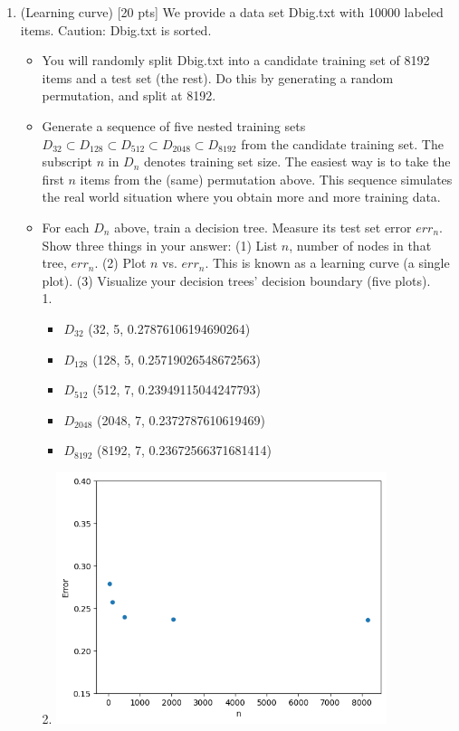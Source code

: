 \documentclass[a4paper]{article}
\theoremstyle{definition}
\begin{document}
\begin{enumerate}
\item (Learning curve)  [20 pts] We provide a data set Dbig.txt with 10000 labeled items.  Caution: Dbig.txt is sorted.
  \begin{itemize}
  
  \item You will randomly split Dbig.txt into a candidate training set of 8192 items and a test set (the rest).  Do this by generating a random permutation, and split at 8192.
  
  \item Generate a sequence of five nested training sets $D_{32} \subset D_{128} \subset D_{512} \subset D_{2048} \subset D_{8192}$ from the candidate training set.  The subscript $n$ in $D_n$ denotes training set size.  The easiest way is to take the first $n$ items from the (same) permutation above.  This sequence simulates the real world situation where you obtain more and more training data.
  
  \item For each $D_n$ above, train a decision tree.  Measure its test set error $err_n$.  Show three things in your answer: (1) List $n$, number of nodes in that tree, $err_n$. (2) Plot $n$ vs. $err_n$.  This is known as a learning curve (a single plot). (3) Visualize your decision trees' decision boundary (five plots). \\

    1.
    \begin{itemize}
        \item $D_{32}$ (32, 5, 0.27876106194690264)
        \item $D_{128}$ (128, 5, 0.25719026548672563)
        \item $D_{512}$ (512, 7, 0.23949115044247793)
        \item $D_{2048}$ (2048, 7, 0.2372787610619469)
        \item $D_{8192}$ (8192, 7, 0.23672566371681414)
    \end{itemize}

    2.
    \includegraphics[width=0.8\textwidth]{hw2/2_7_2.png}\\


\end{itemize}
\end{enumerate}
\end{document}
